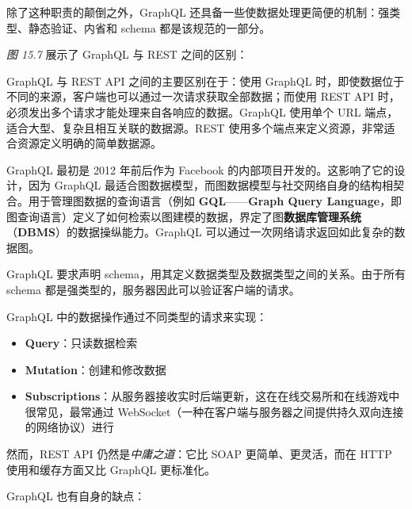 除了这种职责的颠倒之外，GraphQL 还具备一些使数据处理更简便的机制：强类型、静态验证、内省和 schema 都是该规范的一部分。

\emph{图 15.7} 展示了 GraphQL 与 REST 之间的区别：


GraphQL 与 REST API 之间的主要区别在于：使用 GraphQL 时，即使数据位于不同的来源，客户端也可以通过一次请求获取全部数据；而使用 REST API 时，必须发出多个请求才能处理来自各响应的数据。GraphQL 使用单个 URL 端点，适合大型、复杂且相互关联的数据源。REST 使用多个端点来定义资源，非常适合资源定义明确的简单数据源。

\label{idx:1644}
GraphQL 最初是 2012 年前后作为 Facebook 的内部项目开发的。这影响了它的设计，因为 GraphQL 最适合图数据模型，而图数据模型与社交网络自身的结构相契合。用于管理图数据的查询语言（例如 \textbf{GQL}——\textbf{Graph Query Language}，即图查询语言）定义了如何检索以图建模的数据，界定了图\textbf{数据库管理系统}（\textbf{DBMS}）的数据操纵能力。GraphQL 可以通过一次网络请求返回如此复杂的数据图。

\label{idx:1645}
GraphQL 要求声明 schema，用其定义数据类型及数据类型之间的关系。由于所有 schema 都是强类型的，服务器因此可以验证客户端的请求。

GraphQL 中的数据操作通过不同类型的请求来实现：

\begin{itemize}
\item \textbf{Query}：只读数据检索
\item \textbf{Mutation}：创建和修改数据
\label{idx:1646}
\item \textbf{Subscriptions}：从服务器接收实时后端更新，这在在线交易所和在线游戏中很常见，最常通过 WebSocket（一种在客户端与服务器之间提供持久双向连接的网络协议）进行
\end{itemize}

\label{idx:1647}
然而，REST API 仍然是\emph{中庸之道}：它比 SOAP 更简单、更灵活，而在 HTTP 使用和缓存方面又比 GraphQL 更标准化。

GraphQL 也有自身的缺点：

